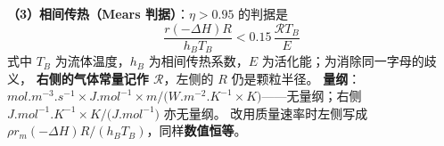 \begin{principle}
\textbf{（3）相间传热（Mears 判据）}：$\eta>0.95$ 的判据是
\begin{equation}
\frac{r(-\Delta H)R}{h_BT_B}<0.15\,\frac{\mathscr{R}T_B}{E}
\label{eq:mears-heat}
\end{equation}
式中 $T_B$ 为流体温度，$h_B$ 为相间传热系数，$E$ 为活化能；为消除同一字母的歧义，
\textbf{右侧的气体常量记作 $\mathscr{R}$}，左侧的 $R$ 仍是颗粒半径。
\textbf{量纲}：$\unit{mol.m^{-3}.s^{-1}}\times\unit{J.mol^{-1}}\times\unit{m}\big/
\big(\unit{W.m^{-2}.K^{-1}}\times\unit{K}\big)$——无量纲；右侧
$\unit{J.mol^{-1}.K^{-1}}\times\unit{K}\big/\big(\unit{J.mol^{-1}}\big)$ 亦无量纲。
改用质量速率时左侧写成 $\rho r_m(-\Delta H)R/(h_BT_B)$，同样\textbf{数值恒等}。
\end{principle}

